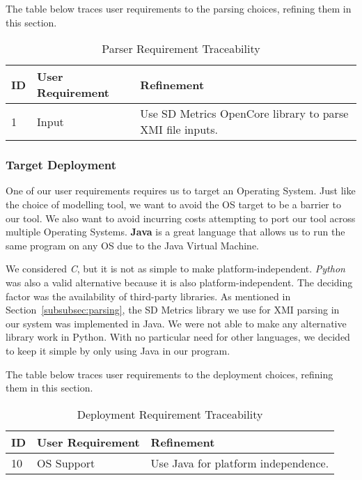 The table below traces user requirements to the parsing choices, refining them in this section.
\begin{table}[htbp]
    \centering
    \caption{Parser Requirement Traceability}\label{tab:parse-choice-table}
    \begin{tabularx}{\textwidth}{| l | l | X |}
        \hline
        \textbf{ID} & \textbf{User Requirement} & \textbf{Refinement} \\
        \hline
        1 & Input & Use SD Metrics OpenCore library to parse XMI file inputs. \\ \hline
    \end{tabularx}
\end{table}

\subsubsection{Target Deployment}
One of our user requirements requires us to target an Operating System.
Just like the choice of modelling tool, we want to avoid the OS target to be a barrier to our tool.
We also want to avoid incurring costs attempting to port our tool across multiple Operating Systems.
\textbf{Java} is a great language that allows us to run the same program on any OS due to the Java Virtual Machine.

We considered \textit{C}, but it is not as simple to make platform-independent.
\textit{Python} was also a valid alternative because it is also platform-independent.
The deciding factor was the availability of third-party libraries.
As mentioned in Section~\ref{subsubsec:parsing}, the SD Metrics library we use for XMI parsing in our system was implemented in Java.
We were not able to make any alternative library work in Python.
With no particular need for other languages, we decided to keep it simple by only using Java in our program.

The table below traces user requirements to the deployment choices, refining them in this section.
\begin{table}[htbp]
    \centering
    \caption{Deployment Requirement Traceability}\label{tab:os-choice-table}
    \begin{tabularx}{\textwidth}{| l | l | X |}
        \hline
        \textbf{ID} & \textbf{User Requirement} & \textbf{Refinement} \\
        \hline
        10 & OS Support & Use Java for platform independence. \\ \hline
    \end{tabularx}
\end{table}

